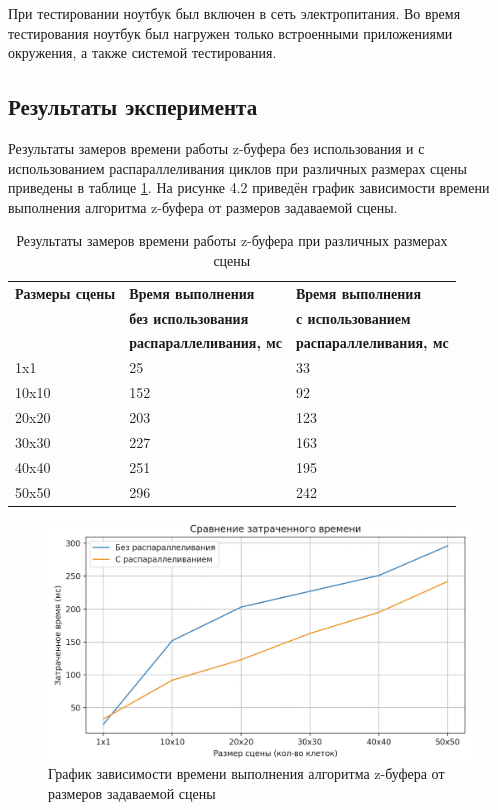 \documentclass[a4paper,14pt, unknownkeysallowed]{extreport}
\begin{document}
При тестировании ноутбук был включен в сеть электропитания. Во время тестирования ноутбук был нагружен только встроенными приложениями окружения, а также системой тестирования.

\subsection{Результаты эксперимента}

Результаты замеров времени работы z-буфера без использования и с использованием распараллеливания циклов при различных размерах сцены приведены в таблице \ref{tbl:table_2}. На рисунке 4.2 приведён график зависимости времени выполнения алгоритма z-буфера от размеров задаваемой сцены.

\begin{center}
\captionsetup{justification=raggedright,singlelinecheck=off}
\begin{longtable}[c]{|l|l|l|}
\caption{Результаты замеров времени работы z-буфера при различных размерах сцены\label{tbl:table_2}}
	\\ \hline
	\textbf{Размеры сцены} & \textbf{Время выполнения} &  \textbf{Время выполнения}
	\\ & \textbf{без использования} & \textbf{с использованием}
	\\ & \textbf{распараллеливания, мс} & \textbf{распараллеливания, мс}
	\\ \hline
	1x1 & 25 & 33
	\\ \hline
	10x10 & 152 & 92
	\\ \hline
	20x20 & 203 & 123
	\\ \hline
	30x30 & 227 & 163
	\\ \hline
	40x40 & 251 & 195
	\\ \hline
	50x50 & 296 & 242
	\\ \hline
\end{longtable}
\end{center}

\begin{figure}[h]
	\centering
	\includegraphics[scale=0.45]{img/time.png}
	\caption{График зависимости времени выполнения алгоритма z-буфера от размеров задаваемой сцены}
	\label{fig:time}
\end{figure} 
\end{document}
